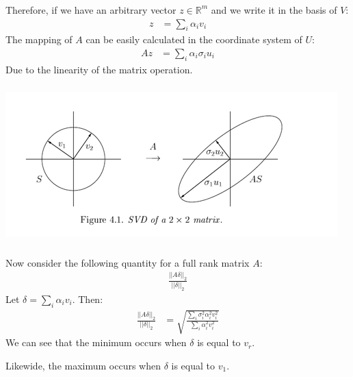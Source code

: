 \begin{frame}[fragile] \frametitle{}

Therefore, if we have an arbitrary vector $z \in \mathbb{R}^m$
and we write it in the basis of $V$:
\begin{align*}
z &= \sum_i \alpha_i v_i
\end{align*}
The mapping of $A$ can be easily calculated in the coordinate system
of $U$:
\begin{align*}
Az &= \sum_i \alpha_i \sigma_i u_i
\end{align*}
Due to the linearity of the matrix operation.

\end{frame}

\begin{frame}[fragile] \frametitle{}

\begin{center}
\includegraphics[width=\textwidth]{img/svd_2d.png}
\end{center}

\end{frame}

\begin{frame}[fragile] \frametitle{}

Now consider the following quantity for a full rank matrix $A$:
\begin{align*}
\frac{|| A\delta ||_2}{||\delta||_2}
\end{align*}
Let $\delta = \sum_i \alpha_i v_i$. Then:
\begin{align*}
\frac{|| A\delta ||_2}{||\delta||_2}
  &= \sqrt{\frac{\sum_i \sigma_i^2 \alpha_i^2 v_i^2}{\sum_i \alpha_i^2 v_i^2}}
\end{align*}
\pause We can see that the minimum occurs when $\delta$ is equal to $v_r$.

\pause Likewide, the maximum occurs when $\delta$ is equal to $v_1$.

\end{frame}

